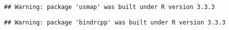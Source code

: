 \documentclass[]{article}
\newenvironment{Shaded}{\begin{snugshade}}{\end{snugshade}}
\newcommand{\KeywordTok}[1]{\textcolor[rgb]{0.13,0.29,0.53}{\textbf{#1}}}
\newcommand{\DataTypeTok}[1]{\textcolor[rgb]{0.13,0.29,0.53}{#1}}
\newcommand{\StringTok}[1]{\textcolor[rgb]{0.31,0.60,0.02}{#1}}
\newcommand{\OperatorTok}[1]{\textcolor[rgb]{0.81,0.36,0.00}{\textbf{#1}}}
\newcommand{\NormalTok}[1]{#1}
\begin{document}
\begin{verbatim}
## Warning: package 'usmap' was built under R version 3.3.3
\end{verbatim}

\begin{Shaded}
\end{Shaded}

\begin{verbatim}
## Warning: package 'bindrcpp' was built under R version 3.3.3
\end{verbatim}
\end{document}
